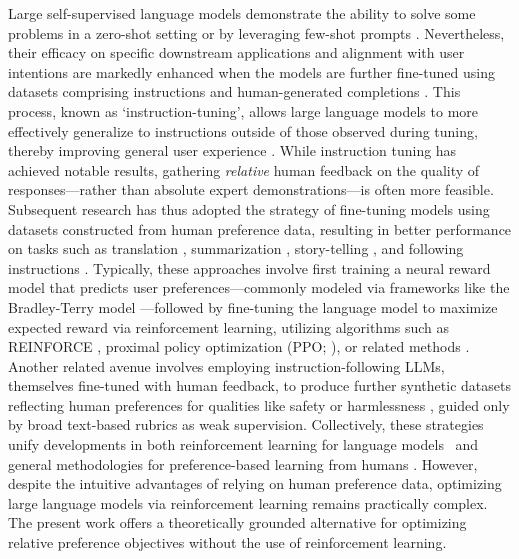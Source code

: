 Large self-supervised language models demonstrate the ability to solve some problems in a zero-shot setting \citep{radford2019language} or by leveraging few-shot prompts \citep{gpt3,megatron,chowdhery2022palm}. Nevertheless, their efficacy on specific downstream applications and alignment with user intentions are markedly enhanced when the models are further fine-tuned using datasets comprising instructions and human-generated completions \citep{mishra-etal-2022-cross,sanh2022multitask,chung2022scaling,thoppilan2022lamda}. This process, known as `instruction-tuning', allows large language models to more effectively generalize to instructions outside of those observed during tuning, thereby improving general user experience \citep{chung2022scaling}. While instruction tuning has achieved notable results, gathering \textit{relative} human feedback on the quality of responses—rather than absolute expert demonstrations—is often more feasible. Subsequent research has thus adopted the strategy of fine-tuning models using datasets constructed from human preference data, resulting in better performance on tasks such as translation \citep{kreutzer-etal-2018-reliability}, summarization \citep{stiennon2022learning,ziegler2020finetuning}, story-telling \citep{ziegler2020finetuning}, and following instructions \citep{ouyang2022training,ramamurthy2023is}. Typically, these approaches involve first training a neural reward model that predicts user preferences—commonly modeled via frameworks like the Bradley-Terry model \citep{bradley1952rankanalysis}—followed by fine-tuning the language model to maximize expected reward via reinforcement learning, utilizing algorithms such as REINFORCE \citep{williams1992reinforce}, proximal policy optimization (PPO; \cite{schulman2017proximal}), or related methods \citep{ramamurthy2023is}. Another related avenue involves employing instruction-following LLMs, themselves fine-tuned with human feedback, to produce further synthetic datasets reflecting human preferences for qualities like safety or harmlessness \citep{bai2022constitutional}, guided only by broad text-based rubrics as weak supervision. Collectively, these strategies unify developments in both reinforcement learning for language models~\citep{Ranzato2015SequenceLT,paulus2018a,wu2018learning} and general methodologies for preference-based learning from humans \citep{christiano2017deep,kupcsik2018learning}. However, despite the intuitive advantages of relying on human preference data, optimizing large language models via reinforcement learning remains practically complex. The present work offers a theoretically grounded alternative for optimizing relative preference objectives without the use of reinforcement learning.

